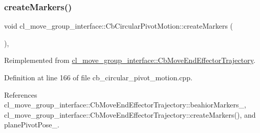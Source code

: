 \mbox{\label{classcl__move__group__interface_1_1CbCircularPivotMotion_a48911ad62608cb00c04e979e2f6f644a}} 
\subsubsection{\texorpdfstring{create\+Markers()}{createMarkers()}}
{\footnotesize\ttfamily void cl\+\_\+move\+\_\+group\+\_\+interface\+::\+Cb\+Circular\+Pivot\+Motion\+::create\+Markers (\begin{DoxyParamCaption}{ }\end{DoxyParamCaption})\hspace{0.3cm}{\ttfamily [override]}, {\ttfamily [virtual]}}



Reimplemented from \hyperlink{classcl__move__group__interface_1_1CbMoveEndEffectorTrajectory_a442efa1d5bc9e9a16f74ecd31b13d9b5}{cl\+\_\+move\+\_\+group\+\_\+interface\+::\+Cb\+Move\+End\+Effector\+Trajectory}.



Definition at line 166 of file cb\+\_\+circular\+\_\+pivot\+\_\+motion.\+cpp.



References cl\+\_\+move\+\_\+group\+\_\+interface\+::\+Cb\+Move\+End\+Effector\+Trajectory\+::beahior\+Markers\+\_\+, cl\+\_\+move\+\_\+group\+\_\+interface\+::\+Cb\+Move\+End\+Effector\+Trajectory\+::create\+Markers(), and plane\+Pivot\+Pose\+\_\+.



